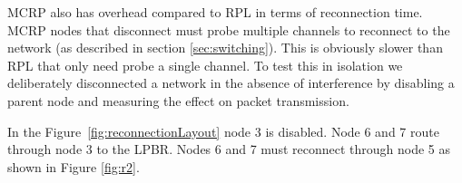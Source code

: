 MCRP also has overhead compared to RPL in terms of reconnection time.  MCRP nodes that disconnect must probe multiple channels to reconnect to the network (as described in section \ref{sec:switching}).  This is obviously slower than RPL that only need probe a single channel.  To test this in isolation we deliberately disconnected a network in the absence of interference by disabling a parent node and measuring the effect on packet transmission.

In the Figure~\ref{fig:reconnectionLayout} node 3 is disabled.
Node 6 and 7 route through node 3 to the LPBR. Nodes 6 and 7 must reconnect through node 5 as shown in Figure \ref{fig:r2}. 

\begin{figure}
\centering
{}        

\end{figure}
